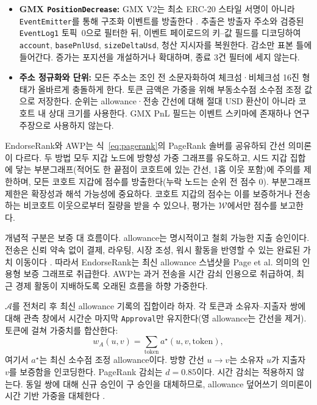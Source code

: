 \begin{itemize}
\item \textbf{GMX \texttt{PositionDecrease}:} GMX V2는 최소 ERC-20 스타일 서명이 아니라 \texttt{EventEmitter}를 통해 구조화 이벤트를 방출한다 . 추출은 방출자 주소와 검증된 \texttt{EventLog1} 토픽~$0$으로 필터한 뒤, 이벤트 페이로드의 키--값 필드를 디코딩하여 \texttt{account}, \texttt{basePnlUsd}, \texttt{sizeDeltaUsd}, 청산 지시자를 복원한다. 감소만 표본 틀에 들어간다. 증가는 포지션을 개설하거나 확대하며, 종료 3건 필터에 세지 않는다.

\item \textbf{주소 정규화와 단위:} 모든 주소는 조인 전 소문자화하여 체크섬·비체크섬 16진 형태가 올바르게 충돌하게 한다. 토큰 금액은 가중을 위해 부동소수점 소수점 조정 값으로 저장한다. 순위는 allowance·전송 간선에 대해 절대 USD 환산이 아니라 코호트 내 상대 크기를 사용한다. GMX PnL 필드는 이벤트 스키마에 존재하나 연구 주장으로 사용하지 않는다.

\end{itemize}


EndorseRank와 AWP는 식~\eqref{eq:pagerank}의 PageRank 솔버를 공유하되 간선 의미론이 다르다. 두 방법 모두 지갑 노드에 방향성 가중 그래프를 유도하고, 시드 지갑 집합에 닿는 부분그래프(적어도 한 끝점이 코호트에 있는 간선, 1홉 이웃 포함)에 주의를 제한하며, 모든 코호트 지갑에 점수를 방출한다(누락 노드는 순위 전 점수 $0$). 부분그래프 제한은 확장성과 해석 가능성에 중요하다. 코호트 지갑의 점수는 이를 보증하거나 전송하는 비코호트 이웃으로부터 질량을 받을 수 있으나, 평가는 $\mathcal{W}$에서만 점수를 보고한다.

개념적 구분은 보증 대 흐름이다. allowance는 명시적이고 철회 가능한 지출 승인이다. 전송은 신뢰 약속 없이 결제, 라우팅, 시장 조성, 워시 활동을 반영할 수 있는 완료된 가치 이동이다 . 따라서 EndorseRank는 최신 allowance 스냅샷을 Page et al. 의미의 인용형 보증 그래프로 취급한다. AWP는 과거 전송을 시간 감쇠 인용으로 취급하여, 최근 경제 활동이 지배하도록 오래된 흐름을 하향 가중한다.


$\mathcal{A}$를 전처리 후 최신 allowance 기록의 집합이라 하자. 각 토큰과 소유자--지출자 쌍에 대해 관측 창에서 시간순 마지막 \texttt{Approval}만 유지한다(영 allowance는 간선을 제거). 토큰에 걸쳐 가중치를 합산한다:
\begin{equation}
\label{eq:approve-weight}
w_A(u,v)
=
\sum_{\mathrm{token}}
a^{\star}(u,v,\mathrm{token}),
\end{equation}
여기서 $a^{\star}$는 최신 소수점 조정 allowance이다. 방향 간선 $u\to v$는 소유자 $u$가 지출자 $v$를 보증함을 인코딩한다. PageRank 감쇠는 $d=0.85$이다. 시간 감쇠는 적용하지 않는다. 동일 쌍에 대해 신규 승인이 구 승인을 대체하므로, allowance 덮어쓰기 의미론이 시간 기반 가중을 대체한다 .

